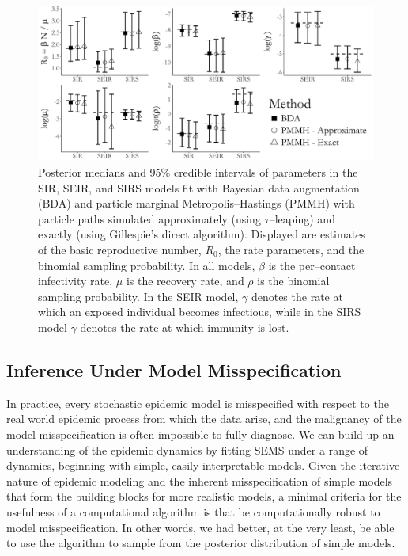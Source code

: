 \begin{figure}[!h]
	\centering
	\includegraphics[width=\linewidth]{figures/sim1_credints.pdf}
	\caption[Posterior estimates of SIR, SEIR, and SIRS model parameters fit to simualted data using Bayesian data augmentation and PMMH.]{Posterior medians and 95\% credible intervals of parameters in the SIR, SEIR, and SIRS models fit with Bayesian data augmentation (BDA) and particle marginal Metropolis--Hastings (PMMH) with particle paths simulated approximately (using $ \tau $--leaping) and exactly (using Gillespie's direct algorithm). Displayed are estimates of the basic reproductive number, $ R_0 $, the rate parameters, and the binomial sampling probability. In all models, $ \beta $ is the per--contact infectivity rate, $ \mu $ is the recovery rate, and $ \rho $ is the binomial sampling probability. In the SEIR model, $ \gamma $ denotes the rate at which an exposed individual becomes infectious, while in the SIRS model $ \gamma $ denotes the rate at which immunity is lost.}
	\label{fig:sim1_credint}
\end{figure}

\subsection{Inference Under Model Misspecification}
\label{subsec:bda_misspec_sim}
In practice, every stochastic epidemic model is misspecified with respect to the real world epidemic process from which the data arise, and the malignancy of the model misspecification is often impossible to fully diagnose. We can build up an understanding of the epidemic dynamics by fitting SEMS under a range of dynamics, beginning with simple, easily interpretable models. Given the iterative nature of epidemic modeling and the inherent misspecification of simple models that form the building blocks for more realistic models, a minimal criteria for the usefulness of a computational algorithm is that be computationally robust to model misspecification. In other words, we had better, at the very least, be able to use the algorithm to sample from the posterior distribution of simple models. 

